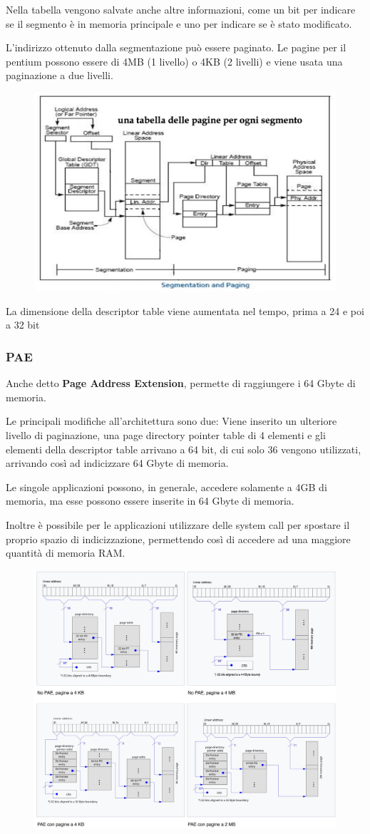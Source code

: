 Nella tabella vengono salvate anche altre informazioni, come un bit per indicare se il segmento è in memoria principale e uno per indicare se è stato modificato.

L'indirizzo ottenuto dalla segmentazione può essere paginato. Le pagine per il pentium possono essere di 4MB (1 livello) o 4KB (2 livelli) e viene usata una paginazione a due livelli.

\begin{figure}[H]
    \centering
    \includegraphics[width=0.5\linewidth]{assets/intel32-3.jpg}
\end{figure}

La dimensione della descriptor table viene aumentata nel tempo, prima a 24 e poi a 32 bit

\subsubsection{PAE}
Anche detto \textbf{Page Address Extension}, permette di raggiungere i 64 Gbyte di memoria.

Le principali modifiche all'architettura sono due: Viene inserito un ulteriore livello di paginazione, una page directory pointer table di 4 elementi e gli elementi della descriptor table arrivano a 64 bit, di cui solo 36 vengono utilizzati, arrivando così ad indicizzare 64 Gbyte di memoria.

\spacer
Le singole applicazioni possono, in generale, accedere solamente a 4GB di memoria, ma esse possono essere inserite in 64 Gbyte di memoria.

Inoltre è possibile per le applicazioni utilizzare delle system call per spostare il proprio spazio di indicizzazione, permettendo così di accedere ad una maggiore quantità di memoria RAM.

\begin{figure}[H]
    \centering
    \includegraphics[width=0.75\linewidth]{assets/pae.jpeg}
\end{figure}

